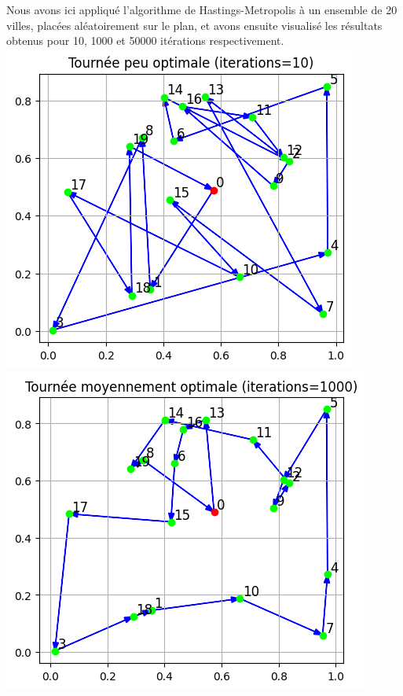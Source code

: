 \documentclass{article}
\begin{document}
\newpage
Nous avons ici appliqué l'algorithme de Hastings-Metropolis à un ensemble de 20 villes, placées aléatoirement sur le plan, et avons ensuite visualisé les résultats obtenus pour 10, 1000 et 50000 itérations respectivement. \\ 

\includegraphics[scale=0.5]{hm_tsp_10_iter.png}
\includegraphics[scale=0.5]{hm_tsp_1000_iter.png}
\end{document}
